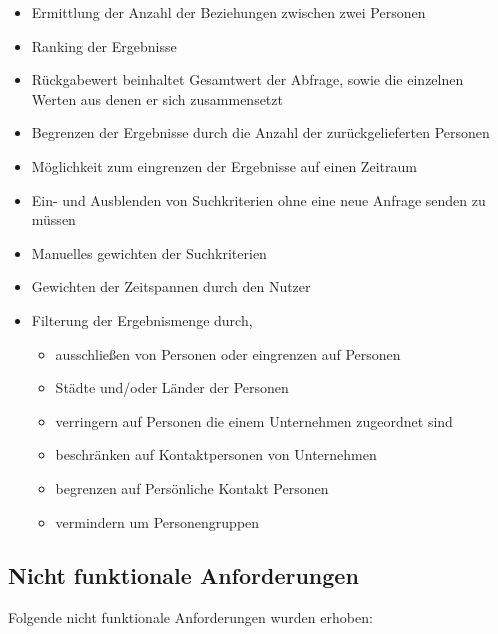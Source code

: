\begin{itemize}
\item Ermittlung der Anzahl der Beziehungen zwischen zwei Personen

\item Ranking der Ergebnisse

\item Rückgabewert beinhaltet Gesamtwert der Abfrage, sowie die einzelnen Werten aus denen er sich zusammensetzt

\item Begrenzen der Ergebnisse durch die Anzahl der zurückgelieferten Personen

\item Möglichkeit zum eingrenzen der Ergebnisse auf einen Zeitraum

\item Ein- und Ausblenden von Suchkriterien ohne eine neue Anfrage senden zu müssen

\item Manuelles gewichten der Suchkriterien

\item Gewichten der Zeitspannen durch den Nutzer

\item Filterung der Ergebnismenge durch,	
	\begin{itemize}
	\item ausschließen von Personen oder eingrenzen auf Personen
	\item Städte und/oder Länder der Personen
	\item verringern auf Personen die einem Unternehmen zugeordnet sind 
	\item beschränken auf Kontaktpersonen von Unternehmen
	\item begrenzen auf Persönliche Kontakt Personen
	\item vermindern um Personengruppen
	\end{itemize}
\end{itemize}

\subsection{Nicht funktionale Anforderungen}

Folgende nicht funktionale Anforderungen wurden erhoben:


